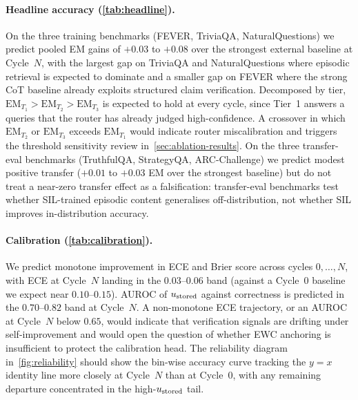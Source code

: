 \paragraph{Headline accuracy (\cref{tab:headline}).}
On the three training benchmarks (FEVER, TriviaQA, NaturalQuestions)
we predict pooled EM gains of $+0.03$ to $+0.08$ over the strongest
external baseline at Cycle~$N$, with the largest gap on TriviaQA and
NaturalQuestions where episodic retrieval is expected to dominate and
a smaller gap on FEVER where the strong CoT baseline already
exploits structured claim verification. Decomposed by tier,
$\mathrm{EM}_{T_1} > \mathrm{EM}_{T_2} > \mathrm{EM}_{T_3}$ is
expected to hold at every cycle, since Tier~1 answers a queries that
the router has already judged high-confidence. A crossover in which
$\mathrm{EM}_{T_2}$ or $\mathrm{EM}_{T_3}$ exceeds $\mathrm{EM}_{T_1}$
would indicate router miscalibration and triggers the threshold
sensitivity review in~\cref{sec:ablation-results}. On the three
transfer-eval benchmarks (TruthfulQA, StrategyQA, ARC-Challenge) we
predict modest positive transfer ($+0.01$ to $+0.03$ EM over the
strongest baseline) but do not treat a near-zero transfer effect as a
falsification: transfer-eval benchmarks test whether SIL-trained
episodic content generalises off-distribution, not whether SIL
improves in-distribution accuracy.

\paragraph{Calibration (\cref{tab:calibration}).}
We predict monotone improvement in ECE and Brier score across cycles
$0,\ldots,N$, with ECE at Cycle~$N$ landing in the $0.03$--$0.06$
band (against a Cycle~$0$ baseline we expect near $0.10$--$0.15$).
AUROC of $u_{\text{stored}}$ against correctness is predicted in the
$0.70$--$0.82$ band at Cycle~$N$. A non-monotone ECE trajectory, or
an AUROC at Cycle~$N$ below $0.65$, would indicate that verification
signals are drifting under self-improvement and would open the
question of whether EWC anchoring is insufficient to protect the
calibration head. The reliability diagram in~\cref{fig:reliability}
should show the bin-wise accuracy curve tracking the $y = x$ identity
line more closely at Cycle~$N$ than at Cycle~$0$, with any remaining
departure concentrated in the high-$u_{\text{stored}}$ tail.

